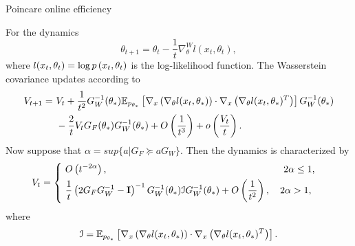 \documentclass{beamer}
\begin{document}
\begin{frame}{Poincare online efficiency }
\scriptsize
\begin{corollary}\label{WFNE}
For the dynamics
\begin{equation*}
    \theta_{t+1} = \theta_t - \frac{1}{t}\nabla_{\theta}^W l(x_t,\theta_t),
\end{equation*}
where $l(x_t,\theta_t) = \log p\left( x_t, \theta_t \right)$ is the log-likelihood function. The Wasserstein covariance updates according to
\begin{equation*}
	\begin{aligned}
	V_{t+1} = & \ V_t + \frac{1}{t^2} G_W^{-1}(\theta_*) \mathbb{E}_{p_{\theta_*}} \left[ \nabla_x \left( \nabla_{\theta}l(x_t,\theta_*) \right) \cdot \nabla_x \left( \nabla_{\theta}l(x_t,\theta_*)^{T} \right)  \right] G_W^{-1}(\theta_*)  \\
& \ - \frac{2}{t} V_t G_F (\theta_*) G_W^{-1} (\theta_*) + O\left( \frac{1}{t^3} \right) + o\left( \frac{V_t}{t} \right) .
	\end{aligned}
\end{equation*}
Now suppose that $\alpha = sup \{ a | G_F \succeq a G_W \}$. Then the dynamics is characterized by
\begin{equation*}\label{Poincare}
    \begin{aligned}
        V_t & = \left\{ 
        \begin{aligned}
            & \ O\left( t^{-2\alpha} \right),  \qquad \qquad \qquad \qquad \qquad \qquad \qquad \qquad \qquad \  2\alpha \leq 1,   \\
            & \  \frac{1}{t}\left( 2G_FG_W^{-1} - \mathbf{I} \right)^{-1}{G_W^{-1}(\theta_*) \mathcal{I}  G_W^{-1}(\theta_*) } + O\left( \frac{1}{t^2} \right), \quad 2\alpha > 1,
        \end{aligned}\right.
        \end{aligned}
        \end{equation*}
where \begin{equation*}
        \mathcal{I} = \mathbb{E}_{p_{\theta_*}} \left[ \nabla_x \left( \nabla_{\theta}l(x_t,\theta_*) \right) \cdot \nabla_x \left( \nabla_{\theta}l(x_t,\theta_*)^{T} \right)  \right].
\end{equation*}
\end{corollary}
\end{frame}
\end{document}
